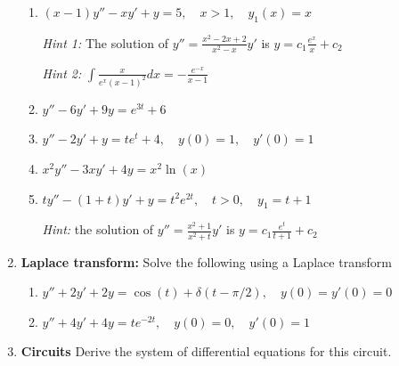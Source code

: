 \documentclass[letterpaper, fontsize=11pt]{scrartcl} %
\numberwithin{equation}{section} %
\numberwithin{figure}{section} %
\numberwithin{table}{section} %
\begin{document}
\begin{enumerate}
\begin{enumerate}
\item $(x-1)y'' -xy' +y=5, \quad x>1,\quad  y_1(x)=x$
\par \textit{Hint 1:} The solution of $y'' = \frac{x^2 - 2x + 2}{x^2 - x}y'$ is $y = c_1\frac{e^x}{x} + c_2$
\par \textit{Hint 2:} $\int \frac{x}{e^x(x - 1)^2}dx = -\frac{e^{-x}}{x-1}$


\item $y'' -6y'+9y=e^{3t} +6$

\item $y'' -2y' +y=te^t +4,\quad y(0) = 1,\quad y'(0) = 1$

\item $x^2y'' -3xy' +4y=x^2 \ln(x)$

\item $ty'' -(1+t)y' +y=t^2e^{2t}, \quad t>0, \quad y_1 = t+1$
\par \textit{Hint:} the solution of $y'' = \frac{x^2+1}{x^2+t}y'$ is $y = c_1\frac{e^t}{t+1} + c_2$

\end{enumerate}




%
%
%
%
%
%


\item \textbf{Laplace transform:} Solve the following using a Laplace transform
\begin{enumerate}

\item $y'' +2y' +2y=\cos(t)+\delta(t-\pi/2),\quad y(0) = y'(0) = 0$

\item $y'' + 4y' + 4y = te^{-2t},\quad y(0) = 0, \quad y'(0) = 1$

\end{enumerate}

\item \textbf{Circuits} Derive the system of differential equations for this circuit.


\end{enumerate}
\end{document}
